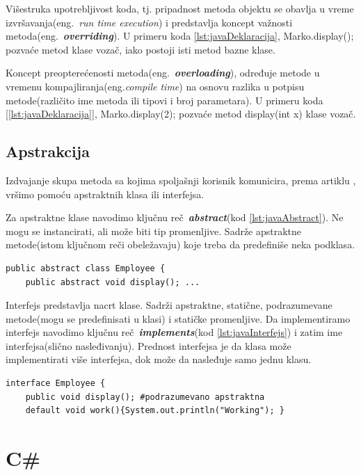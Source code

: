 \documentclass[a4paper]{article}
\begin{document}
Višestruka upotrebljivost koda, tj. pripadnost metoda objektu se obavlja u vreme izvršavanja(eng.~{\em run time execution}) i predstavlja koncept važnosti metoda(eng.~{\em\textbf{overriding}})\cite{horstmann2017core}. U primeru koda \ref{lst:javaDeklaracija}, Marko.display(); pozvaće metod klase vozač, iako postoji isti metod bazne klase.

Koncept preopterećenosti metoda(eng.~{\em\textbf{overloading}})\cite{horstmann2017core}, određuje metode u vremenu kompajliranja(eng.{\em compile time}) na osnovu razlika u potpisu metode(različito ime metoda ili tipovi i broj parametara). U primeru koda [\ref{lst:javaDeklaracija}], Marko.display(2); pozvaće metod display(int x) klase vozač.

\subsection{Apstrakcija}
\label{subsec:javaApstrakcija}

Izdvajanje skupa metoda sa kojima spoljašnji korisnik komunicira, prema artiklu \cite{oopJava}, vršimo pomoću apstraktnih klasa ili interfejsa.

Za apstraktne klase navodimo ključnu reč~{\em \textbf{abstract}}(kod \ref{lst:javaAbstract}). Ne mogu se instancirati, ali može biti tip promenljive. Sadrže apstraktne metode(istom ključnom reči obeležavaju) koje treba da predefiniše neka podklasa.

\begin{lstlisting}[caption={Apstraktna klasa},frame=single, label=lst:javaAbstract]
public abstract class Employee {
	public abstract void display(); ...
\end{lstlisting}

Interfejs predstavlja nacrt klase. Sadrži apstraktne, statične, podrazumevane metode(mogu se predefinisati u klasi) i statičke promenljive. Da implementiramo interfejs navodimo ključnu reč~{\em \textbf{implements}}(kod \ref{lst:javaInterfejs}) i zatim ime interfejsa(slično nasleđivanju). Prednost interfejsa\cite{horstmann2017core} je da klasa može implementirati više interfejsa, dok može da nasleđuje samo jednu klasu.

\begin{lstlisting}[caption={Interfejs},frame=single, label=lst:javaInterfejs]
interface Employee {
	public void display(); #podrazumevano apstraktna
	default void work(){System.out.println("Working"); }
\end{lstlisting}


\section{C\#}
\label{sec:csharp}
\end{document}
